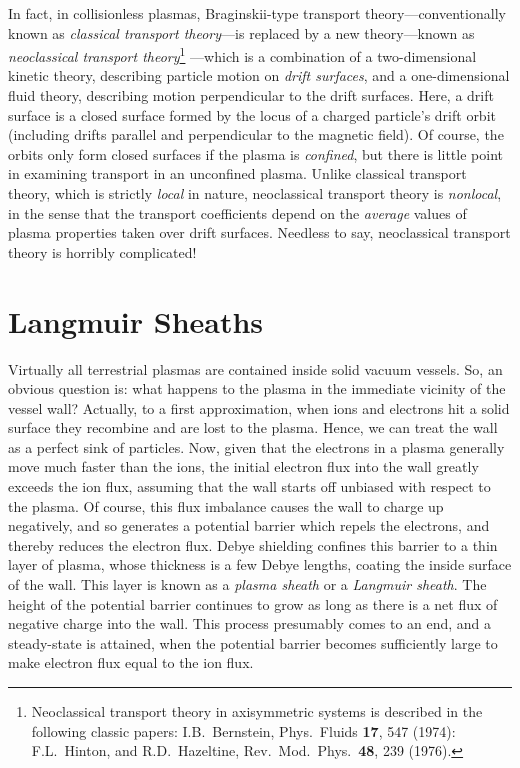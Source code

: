 In fact, in collisionless plasmas, Braginskii-type transport theory---convention\-ally
known as {\em classical transport theory}---is replaced by a new theory---known as
{\em neoclassical transport  theory}\footnote{Neoclassical transport theory in
axisymmetric systems is
 described in the following classic papers: I.B.~Bernstein, Phys.\
Fluids {\bf 17}, 547 (1974): F.L.~Hinton, and R.D.~Hazeltine,
Rev.\ Mod.\ Phys.\ {\bf 48}, 239 (1976).}
---which is a combination of a two-dimensional
kinetic theory, describing particle motion on {\em drift surfaces}, and
a one-dimensional fluid theory, describing motion perpendicular to the drift
surfaces. Here, a drift surface is a closed surface formed by the locus of a
charged particle's drift orbit (including
drifts parallel and perpendicular to the magnetic field).
 Of course, the orbits only form closed surfaces if the plasma is {\em confined},
but there is little point in examining transport in an unconfined plasma. 
Unlike classical
transport theory, which is strictly {\em  local}\/ in nature,
neoclassical transport theory is {\em nonlocal}, in the sense that the
transport coefficients depend on the {\em average}\/ values of
 plasma properties taken over
drift surfaces. Needless to say, neoclassical transport theory
is horribly complicated!

\section{Langmuir Sheaths}
Virtually all terrestrial plasmas are contained inside solid vacuum vessels. So, an obvious question is: what happens to the plasma in the immediate vicinity of the  vessel wall?  Actually, to a first approximation, when ions and electrons hit a solid surface they recombine and are lost to the plasma. Hence, we can
treat the wall as a perfect sink of particles. Now, given that the electrons in a plasma generally
move much faster than the ions, the initial electron flux into the wall greatly
exceeds the ion flux, assuming that the wall starts off
unbiased with respect to the plasma. Of course, this flux imbalance causes the wall to charge up negatively, and so
generates a potential barrier which repels the electrons, and thereby
reduces the electron flux.
Debye shielding
confines this barrier to a thin layer of plasma, whose thickness is a few
Debye lengths, coating the inside surface of the wall. This layer
is known as a {\em plasma sheath}\/ or a {\em Langmuir sheath}. 
The height of the potential barrier  continues to grow as long
as there is a net  flux of negative charge into the wall.
This process presumably comes to an end, and a steady-state is attained, when the potential barrier becomes sufficiently large to make electron flux  equal to the ion flux.

